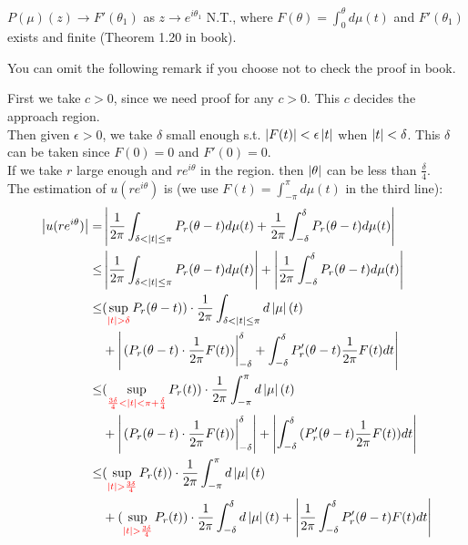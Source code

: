 $P(\mu)(z)\to F'(\theta_1)$ as $z\to e^{i\theta_1}$ N.T., where $F(\theta)=\int_0^\theta{d\mu(t)}$ and $F'(\theta_1)$ exists and finite (Theorem 1.20 in book).\par
You can omit the following remark if you choose not to check the proof in book.
\begin{remark}
    First we take $c>0$, since we need proof for any $c>0$. This $c$ decides the approach region.\\
    Then given $\epsilon>0$, we take $\delta$ small enough s.t. $\left\lvert F(t)\right\rvert<\epsilon\left\lvert t\right\rvert$ when $\left\lvert t\right\rvert<\delta$. This $\delta$ can be taken since
    $F(0)=0$ and $F'(0)=0$.\\
    If we take $r$ large enough and $re^{i\theta}$ in the region. then $\left\lvert\theta\right\rvert$ can be less than $\frac{\delta}{4}$.\\
    The estimation of $u(re^{i\theta})$ is (we use $F(t)=\int_{-\pi}^{\pi}{d\mu (t)}$ in the third line):
    \begin{align*}
        \left\lvert u(re^{i\theta})\right\rvert= & \left\lvert\frac{1}{2\pi}\int_{\delta<\left\lvert t\right\rvert\leq\pi}{P_r(\theta-t)d\mu(t)}+\frac{1}{2\pi}\int_{-\delta}^{\delta}{P_r(\theta-t)d\mu(t)}\right\rvert                     \\
        \leq                   & \left\lvert\frac{1}{2\pi}\int_{\delta<\left\lvert t\right\rvert\leq\pi}{P_r(\theta-t)d\mu(t)}\right\rvert+\left\lvert\frac{1}{2\pi}\int_{-\delta}^{\delta}{P_r(\theta-t)d\mu(t)}\right\rvert               \\
        \leq                   & (\sup_{{\color{red}\left\lvert t\right\rvert>\delta}}{P_r(\theta-t)})\cdot\frac{1}{2\pi}\int_{\delta<\left\lvert t\right\rvert\leq\pi}{d\left\lvert\mu\right\rvert(t)}                                      \\
                               & +\left\lvert\left.(P_r(\theta-t)\cdot\frac{1}{2\pi}F(t))\right\rvert_{-\delta}^{\delta}
        +\int_{-\delta}^{\delta}{P_r'(\theta-t)\frac{1}{2\pi}F(t)d t}\right\rvert                                                                                                                  \\
        \leq                   & (\sup_{{\color{red}\frac{3\delta}{4}<\left\lvert t\right\rvert<\pi+\frac{\delta}{4}}}{P_r(t)})\cdot\frac{1}{2\pi}\int_{-\pi}^{\pi}{d\left\lvert\mu\right\rvert(t)}                        \\
                               & +\left\lvert\left.(P_r(\theta-t)\cdot\frac{1}{2\pi}F(t))\right\rvert_{-\delta}^{\delta}\right\rvert+\left\lvert\int_{-\delta}^{\delta}{(P_r'(\theta-t)\frac{1}{2\pi}F(t))dt}\right\rvert \\
        \leq                   & (\sup_{{\color{red}\left\lvert t\right\rvert>\frac{3\delta}{4}}}{P_r(t)})\cdot\frac{1}{2\pi}\int_{-\pi}^{\pi}{d\left\lvert\mu\right\rvert(t)}                                             \\
                               & +(\sup_{{\color{red}\left\lvert t\right\rvert>\frac{3\delta}{4}}}{P_r(t)})\cdot\frac{1}{2\pi}\int_{-\delta}^{\delta}{d\left\lvert\mu\right\rvert(t)}+
        \left\lvert\frac{1}{2\pi}\int_{-\delta}^{\delta}{P_r'(\theta-t)F(t)dt}\right\rvert
    \end{align*}
\end{remark}
